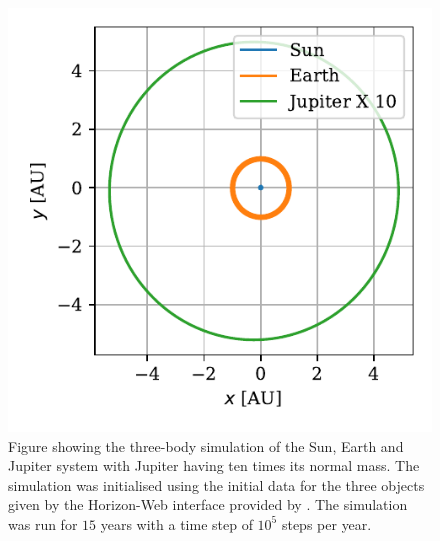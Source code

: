 \documentclass[twocolumn]{aastex62}
\begin{document}
\begin{figure}
\includegraphics[scale=1]{Figures/jupiter10.pdf}
\caption{Figure showing the three-body simulation of the Sun, Earth and Jupiter system
with Jupiter having ten times its normal mass. The simulation was initialised using the
initial data for the three objects given by the Horizon-Web interface provided by \cite{nasa:2018}. The simulation
was run for $15$ years with a time step of $10^5$ steps per year.}
\label{fig:jupiter10}
\end{figure}
\end{document}
